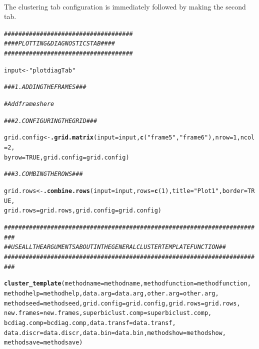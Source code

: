 \documentclass[a4paper]{article}\usepackage[]{graphicx}\usepackage[]{color}
\makeatletter
\newcommand{\hlnum}[1]{\textcolor[rgb]{0.686,0.059,0.569}{#1}}%
\newcommand{\hlstr}[1]{\textcolor[rgb]{0.192,0.494,0.8}{#1}}%
\newcommand{\hlcom}[1]{\textcolor[rgb]{0.678,0.584,0.686}{\textit{#1}}}%
\newcommand{\hlstd}[1]{\textcolor[rgb]{0.345,0.345,0.345}{#1}}%
\newcommand{\hlkwb}[1]{\textcolor[rgb]{0.69,0.353,0.396}{#1}}%
\newcommand{\hlkwc}[1]{\textcolor[rgb]{0.333,0.667,0.333}{#1}}%
\newcommand{\hlkwd}[1]{\textcolor[rgb]{0.737,0.353,0.396}{\textbf{#1}}}%
\newenvironment{kframe}{%
 \def\at@end@of@kframe{}%
 \ifinner\ifhmode%
  \def\at@end@of@kframe{\end{minipage}}%
  \begin{minipage}{\columnwidth}%
 \fi\fi%
 \def\FrameCommand##1{\hskip\@totalleftmargin \hskip-\fboxsep
 \colorbox{shadecolor}{##1}\hskip-\fboxsep
     \hskip-\linewidth \hskip-\@totalleftmargin \hskip\columnwidth}%
 \MakeFramed {\advance\hsize-\width
   \@totalleftmargin\z@ \linewidth\hsize
   \@setminipage}}%
 {\par\unskip\endMakeFramed%
 \at@end@of@kframe}
\newenvironment{knitrout}{}{} %
\makeatother
\begin{document}
\newpage
{}\\
\noindent The clustering tab configuration is immediately followed by making
the second tab.
\begin{knitrout}
\color{fgcolor}\begin{kframe}
\begin{alltt}
\hlcom{####################################}
\hlcom{#### PLOTTING & DIAGNOSTICS TAB ####}
\hlcom{####################################}

\hlstd{input} \hlkwb{<-} \hlstr{"plotdiagTab"}

\hlcom{### 1. ADDING THE FRAMES ###}

\hlcom{# Add frames here}

\hlcom{### 2. CONFIGURING THE GRID ###}

\hlstd{grid.config} \hlkwb{<-} \hlkwd{.grid.matrix}\hlstd{(}\hlkwc{input}\hlstd{=input,}\hlkwd{c}\hlstd{(}\hlstr{"frame5"}\hlstd{,}\hlstr{"frame6"}\hlstd{),}\hlkwc{nrow}\hlstd{=}\hlnum{1}\hlstd{,}\hlkwc{ncol}\hlstd{=}\hlnum{2}\hlstd{,}
   \hlkwc{byrow}\hlstd{=}\hlnum{TRUE}\hlstd{,}\hlkwc{grid.config}\hlstd{=grid.config)}

\hlcom{### 3. COMBING THE ROWS ###}

\hlstd{grid.rows} \hlkwb{<-} \hlkwd{.combine.rows}\hlstd{(}\hlkwc{input}\hlstd{=input,}\hlkwc{rows}\hlstd{=}\hlkwd{c}\hlstd{(}\hlnum{1}\hlstd{),}\hlkwc{title}\hlstd{=}\hlstr{"Plot 1"}\hlstd{,}\hlkwc{border}\hlstd{=}\hlnum{TRUE}\hlstd{,}
   \hlkwc{grid.rows}\hlstd{=grid.rows,}\hlkwc{grid.config}\hlstd{=grid.config)}

\hlcom{#########################################################################}
\hlcom{## USE ALL THE ARGUMENTS ABOUT IN THE GENERAL CLUSTERTEMPLATE FUNCTION ##}
\hlcom{#########################################################################}

\hlkwd{cluster_template}\hlstd{(}\hlkwc{methodname}\hlstd{=methodname,}\hlkwc{methodfunction}\hlstd{=methodfunction,}
   \hlkwc{methodhelp}\hlstd{=methodhelp,}\hlkwc{data.arg}\hlstd{=data.arg,}\hlkwc{other.arg}\hlstd{=other.arg,}
   \hlkwc{methodseed}\hlstd{=methodseed,}\hlkwc{grid.config}\hlstd{=grid.config,}\hlkwc{grid.rows}\hlstd{=grid.rows,}
   \hlkwc{new.frames}\hlstd{=new.frames,}\hlkwc{superbiclust.comp}\hlstd{=superbiclust.comp,}
   \hlkwc{bcdiag.comp}\hlstd{=bcdiag.comp,}\hlkwc{data.transf}\hlstd{=data.transf,}
   \hlkwc{data.discr}\hlstd{=data.discr,}\hlkwc{data.bin}\hlstd{=data.bin,}\hlkwc{methodshow}\hlstd{=methodshow,}
   \hlkwc{methodsave}\hlstd{=methodsave)}
\end{alltt}
\end{kframe}
\end{knitrout}
\end{document}
